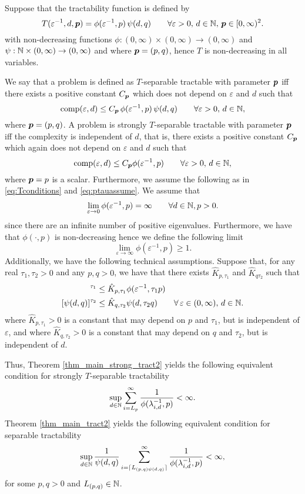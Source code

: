 \documentclass[11pt,a4paper]{article}
\begin{document}
\begin{example}
Suppose that the tractability function is defined by
\[
 T(\varepsilon^{-1},d,\boldsymbol{p})= \phi(\varepsilon^{-1},p)\, \psi(d,q)
 \qquad \forall \varepsilon > 0, \,  d \in \mathbb{N}, \, \boldsymbol{p} \in [0,\infty)^2.
\]
with non-decreasing functions $\phi : (0,\infty) \times (0,\infty) \to (0,\infty)$ and $\psi : \mathbb{N}  \times (0,\infty) \to (0,\infty)$ and where $\boldsymbol{p} = (p,q)$, hence $T$ is non-decreasing in all variables.

We say that a problem is defined as $T$-separable tractable with parameter $\boldsymbol{p}$ iff there exists a positive constant $C_{\boldsymbol{p}}$ which does not depend on $\varepsilon$ and $d$ such that
\[
\operatorname{comp}(\varepsilon,d) \leq  C_{\boldsymbol{p}}\,\phi(\varepsilon^{-1},p)\, \psi(d,q)\qquad \forall \varepsilon >0, \, d\in\mathbb{N},
\] where $\boldsymbol{p} = (p,q)$.
A problem is strongly $T$-separable tractable with parameter $\boldsymbol{p}$ iff the complexity is independent of $d$, that is, there exists a positive constant $C_{\boldsymbol{p}}$ which again does not depend on $\varepsilon$ and $d$ such that
\[
\operatorname{comp}(\varepsilon,d) \leq C_{\boldsymbol{p}}\phi(\varepsilon^{-1},p)\qquad \forall \varepsilon >0, \, d\in\mathbb{N},
\] where $\boldsymbol{p} = p$ is a scalar. 
Furthermore, we assume the following as in \eqref{eq:Tconditions} and \eqref{eq:ptauassume}. We assume that
\[
\lim_{\varepsilon\rightarrow0}\phi(\varepsilon^{-1},p) = \infty \qquad \forall d\in\mathbb{N}, p >0.
\] since there are an infinite number of positive eigenvalues. Furthermore, we have that $\phi(\cdot,p)$ is non-decreasing hence we define the following limit
\[ \lim_{\varepsilon \rightarrow \infty}\phi(\varepsilon^{-1},p)\geq 1.
\] 
Additionally, we have the following technical assumptions. Suppose that, for any real $\tau_1, \tau_2>0$ and any $p,q>0$, we have that there exists $\hat{K}_{p,\tau_1}$ and $\hat{K}_{q\tau_2}$ such that
\begin{align*}
     [\phi(\varepsilon^{-1},p)]^{\tau_1} &\le \hat{K}_{p,\tau_1} \phi (\varepsilon^{-1},\tau_1 p)\\
      [\psi(d,q)]^{\tau_2} &\le \hat{K}_{q,\tau_2} \psi (d,\tau_2 q) \qquad \forall \, \varepsilon \in (0,\infty),\, d\in \naturals.
\end{align*} where $\hat{K}_{p,\tau_1}>0$ is a constant that may depend on $p$ and $\tau_1$, but is independent of $\varepsilon$, and where $\hat{K}_{q,\tau_2}>0$ is a constant that may depend on $q$ and $\tau_2$, but is independent of $d$.

Thus, Theorem \ref{thm_main_strong_tract2} yields the following equivalent condition for strongly $T$-separable tractability
\begin{equation*} \label{eq:strong_tractiff}
     \sup_{d \in \mathbb{N}} \sum_{i = L_p}^\infty \frac{1}{\phi(\lambda_{i, d}^{-1},p)} < \infty.
\end{equation*}
Theorem \ref{thm_main_tract2} yields the following equivalent condition for 
separable tractability
\[
 \sup_{d \in \mathbb{N}} \frac{1}{\psi(d,q)} \sum_{i = \lceil L_{(p,q)\psi(d,q)}\rceil}^\infty \frac{1}{\phi(\lambda_{i, d}^{-1},p)} < \infty,
\] for some $p,q >0$ and $L_{(p,q)}\in\mathbb{N}$.
\end{example}
\end{document}
